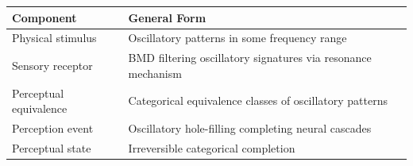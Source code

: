 \begin{center}
\begin{tabular}{p{4cm}p{10cm}}
\toprule
\textbf{Component} & \textbf{General Form} \\
\midrule
Physical stimulus & Oscillatory patterns in some frequency range \\
Sensory receptor & BMD filtering oscillatory signatures via resonance mechanism \\
Perceptual equivalence & Categorical equivalence classes of oscillatory patterns \\
Perception event & Oscillatory hole-filling completing neural cascades \\
Perceptual state & Irreversible categorical completion \\
\bottomrule
\end{tabular}
\end{center}
